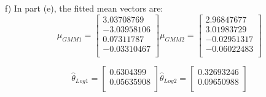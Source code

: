 \documentclass[11pt]{article}
\newenvironment{problem}[2][Problem]{\begin{trivlist}
\item[\hskip \labelsep {\bfseries #1}\hskip \labelsep {\bfseries #2.}]}{\end{trivlist}}
\begin{document}
\begin{problem}{2.4}
(f) In part (e), the fitted mean vectors are:
\[\mu_{GMM1}=
	\begin{bmatrix}
		3.03708769\\
		-3.03958106\\
		0.07311787\\
		-0.03310467\\
	 \end{bmatrix}
   \mu_{GMM2}=
	\begin{bmatrix}
		2.96847677\\
		3.01983729\\
		-0.02951317\\
		-0.06022483\\
	 \end{bmatrix}
\]

\[\hat{\theta}_{Log1}=
	\begin{bmatrix}
		0.6304399\\
		0.05635908\\
	 \end{bmatrix}
   \hat{\theta}_{Log2}=
	\begin{bmatrix}
		0.32693246\\
		0.09650988\\
	 \end{bmatrix}
\]

\end{problem}
\end{document}
